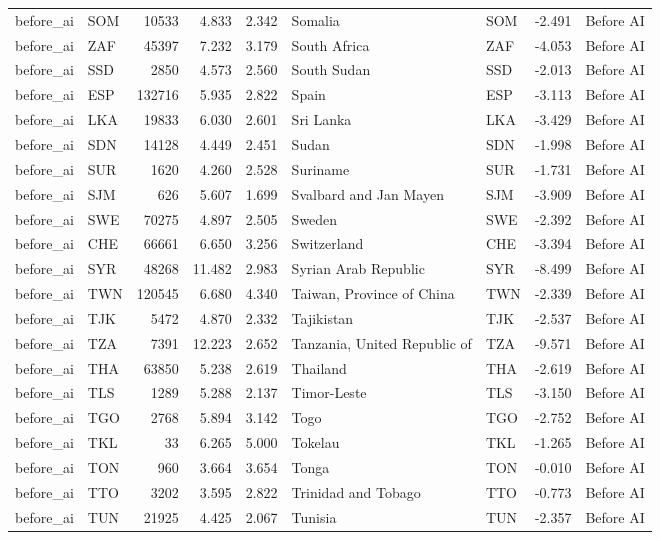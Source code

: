 \begin{tabular}{llrrrllrl}
before\_ai & SOM & 10533 & 4.833 & 2.342 & Somalia & SOM & -2.491 & Before AI \\
before\_ai & ZAF & 45397 & 7.232 & 3.179 & South Africa & ZAF & -4.053 & Before AI \\
before\_ai & SSD & 2850 & 4.573 & 2.560 & South Sudan & SSD & -2.013 & Before AI \\
before\_ai & ESP & 132716 & 5.935 & 2.822 & Spain & ESP & -3.113 & Before AI \\
before\_ai & LKA & 19833 & 6.030 & 2.601 & Sri Lanka & LKA & -3.429 & Before AI \\
before\_ai & SDN & 14128 & 4.449 & 2.451 & Sudan & SDN & -1.998 & Before AI \\
before\_ai & SUR & 1620 & 4.260 & 2.528 & Suriname & SUR & -1.731 & Before AI \\
before\_ai & SJM & 626 & 5.607 & 1.699 & Svalbard and Jan Mayen & SJM & -3.909 & Before AI \\
before\_ai & SWE & 70275 & 4.897 & 2.505 & Sweden & SWE & -2.392 & Before AI \\
before\_ai & CHE & 66661 & 6.650 & 3.256 & Switzerland & CHE & -3.394 & Before AI \\
before\_ai & SYR & 48268 & 11.482 & 2.983 & Syrian Arab Republic & SYR & -8.499 & Before AI \\
before\_ai & TWN & 120545 & 6.680 & 4.340 & Taiwan, Province of China & TWN & -2.339 & Before AI \\
before\_ai & TJK & 5472 & 4.870 & 2.332 & Tajikistan & TJK & -2.537 & Before AI \\
before\_ai & TZA & 7391 & 12.223 & 2.652 & Tanzania, United Republic of & TZA & -9.571 & Before AI \\
before\_ai & THA & 63850 & 5.238 & 2.619 & Thailand & THA & -2.619 & Before AI \\
before\_ai & TLS & 1289 & 5.288 & 2.137 & Timor-Leste & TLS & -3.150 & Before AI \\
before\_ai & TGO & 2768 & 5.894 & 3.142 & Togo & TGO & -2.752 & Before AI \\
before\_ai & TKL & 33 & 6.265 & 5.000 & Tokelau & TKL & -1.265 & Before AI \\
before\_ai & TON & 960 & 3.664 & 3.654 & Tonga & TON & -0.010 & Before AI \\
before\_ai & TTO & 3202 & 3.595 & 2.822 & Trinidad and Tobago & TTO & -0.773 & Before AI \\
before\_ai & TUN & 21925 & 4.425 & 2.067 & Tunisia & TUN & -2.357 & Before AI \\

\end{tabular}
